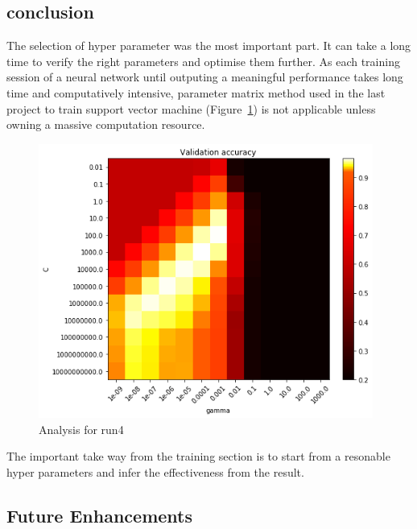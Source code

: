 \documentclass[paper=a4, fontsize=11pt]{scrartcl} %
\numberwithin{equation}{section} %
\numberwithin{figure}{section} %
\numberwithin{table}{section} %
\begin{document}
\subsection{conclusion}
The selection of hyper parameter was the most important part. It can take a long time to verify the right parameters and optimise them further. As each training session of a neural network until outputing a meaningful performance takes long time and computatively intensive, parameter matrix method used in the last project to train support vector machine (Figure~\ref{fig:svmTrainMatrix}) is not applicable unless owning a massive computation resource.
\begin{figure}	
	\includegraphics[width=0.9\linewidth, height=9cm]{./imgs/indexSVM4500feats.png} 
	\caption{Analysis for run4}
	\label{fig:svmTrainMatrix}
 \end{figure}
The important take way from the training section is to start from a resonable hyper parameters and infer the effectiveness from the result.

\subsection{Future Enhancements}\label{rubric01}
\end{document}
